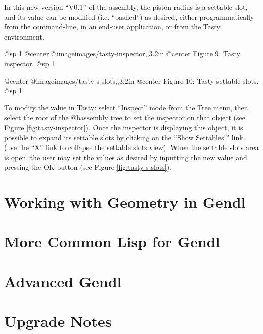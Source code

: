 \documentclass [11pt]{book}
\begin{document}
In this new version ``V0.1'' of the assembly, the piston radius is a
settable slot, and its value can be modified (i.e. ``bashed'') as
desired, either programmatically from the command-line, in an end-user
application, or from the Tasty environment.




@sp 1
@center @image{images/tasty-inspector,,3.2in}
@center Figure 9: Tasty inspector.
@sp 1




@center @image{images/tasty-s-slots,,3.2in}
@center Figure 10: Tasty settable slots.
@sp 1



To modify the value in Tasty: select ``Inspect'' mode from the Tree
menu, then select the root of the @b{assembly} tree to set the
inspector on that object (see Figure 
\ref{fig:tasty-inspector}). Once the inspector is displaying this object, it is
possible to expand its settable slots by clicking on the ``Show
Settables!''  link. (use the ``X'' link to collapse the settable slots
view). When the settable slots area is open, the user may set the
values as desired by inputting the new value and pressing the OK
button (see Figure 
\ref{fig:tasty-s-slots}).



\chapter{Working with Geometry in Gendl}

\label{chap:workingwithgeometryingendl}



\chapter{More Common Lisp for Gendl}

\label{chap:morecommonlispforgendl}



\chapter{Advanced Gendl}

\label{chap:advancedgendl}



\chapter*{Upgrade Notes}
\end{document}
